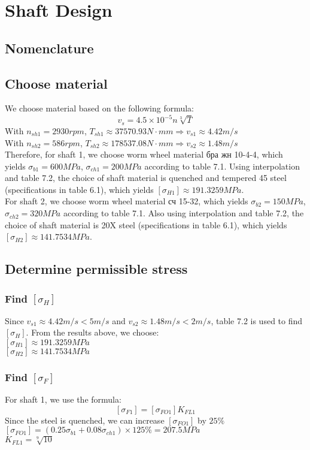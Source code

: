 \chapter{Shaft Design}
\section{Nomenclature	}
\section{Choose material}
We choose material based on the following formula:
\[v_s=4.5\times10^{-5}n\sqrt[3]{T}\]
With $ n_{sh1} = 2930\unit{rpm} $, $ T_{sh1} \approx 37570.93\unit{N\cdot mm} \Rightarrow v_{s1} \approx 4.42 \unit{m/s}$\\
With $ n_{sh2} = 586\unit{rpm} $, $ T_{sh2} \approx 178537.08\unit{N\cdot mm} \Rightarrow v_{s2} \approx 1.48 \unit{m/s}$\\
Therefore, for shaft 1, we choose worm wheel material \foreignlanguage{russian}{бра жн} 10-4-4, which yields $ \sigma_{b1}=600\unit{MPa} $, $ \sigma_{ch1} = 200\unit{MPa} $ according to table 7.1. Using interpolation and table 7.2, the choice of shaft material is quenched and tempered 45 steel (specifications in table 6.1), which yields $ [\sigma_{H1}] \approx 191.3259 \unit{MPa}$.\\
For shaft 2, we choose worm wheel material \foreignlanguage{russian}{сч} 15-32, which yields $ \sigma_{b2}=150\unit{MPa} $, $ \sigma_{ch2} = 320\unit{MPa} $ according to table 7.1. Also using interpolation and table 7.2, the choice of shaft material is 20X steel (specifications in table 6.1), which yields $ [\sigma_{H2}] \approx 141.7534 \unit{MPa}$.

\section{Determine permissible stress}

\subsection{Find $ [\sigma_H] $}
Since $v_{s1} \approx 4.42 \unit{m/s} < 5\unit{m/s}$ and $v_{s2} \approx 1.48 \unit{m/s} < 2\unit{m/s}$, table 7.2 is used to find $ [\sigma_H] $. From the results above, we choose:\\
$ [\sigma_{H1}] \approx 191.3259 \unit{MPa}$\\
$ [\sigma_{H2}] \approx 141.7534 \unit{MPa}$

\subsection{Find $ [\sigma_F] $}
For shaft 1, we use the formula:
\[[\sigma_{F1}] = [\sigma_{FO1}]K_{FL1}\]
Since the steel is quenched, we can increase $ [\sigma_{FO1}] $ by $ 25\% $
$ [\sigma_{FO1}] = (0.25\sigma_{b1} + 0.08\sigma_{ch1})\times125\% = 207.5\unit{MPa} $\\
$ K_{FL1} = \sqrt[9]{10}$